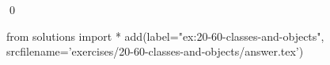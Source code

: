 
\begin{ex}
  \label{ex:20-60-classes-and-objects}
  
  \qed
\end{ex}
\begin{python0}
from solutions import *
add(label="ex:20-60-classes-and-objects",
    srcfilename='exercises/20-60-classes-and-objects/answer.tex')
\end{python0}
